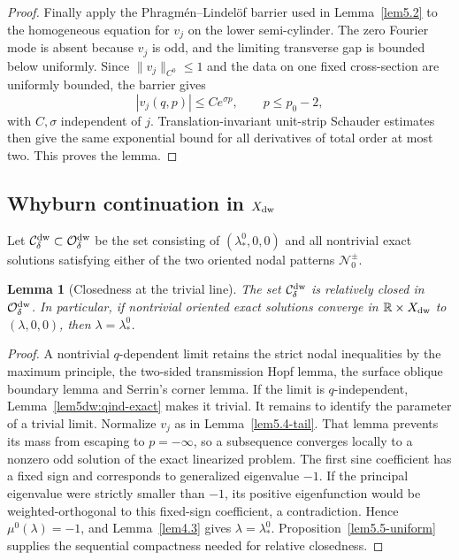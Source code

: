 \documentclass[11pt,reqno]{amsart}
\numberwithin{equation}{section}
\newtheorem{lemma}[theorem]{Lemma}
\theoremstyle{definition}
\theoremstyle{remark}
\begin{document}
\begin{proof}
Finally apply the Phragm\'en--Lindel\"of barrier used in
Lemma~\ref{lem5.2} to the homogeneous equation for $v_j$ on the lower
semi-cylinder.  The zero Fourier mode is absent because $v_j$ is odd,
and the limiting transverse gap is bounded below uniformly.  Since
$\|v_j\|_{C^0}\le1$ and the data on one fixed cross-section are
uniformly bounded, the barrier gives
\[
 |v_j(q,p)|\le Ce^{\sigma p},\qquad p\le p_0-2,
\]
with $C,\sigma$ independent of $j$.  Translation-invariant unit-strip
Schauder estimates then give the same exponential bound for all
derivatives of total order at most two.  This proves the lemma.
\end{proof}

\subsection{Whyburn continuation in $X_{\rm dw}$}

Let $\mathcal C_\delta^{\rm dw}\subset\mathcal O_\delta^{\rm dw}$ be
the set consisting of $(\lambda_*^0,0,0)$ and all nontrivial exact
solutions satisfying either of the two oriented nodal patterns
$\mathcal N_0^\pm$.

\begin{lemma}[Closedness at the trivial line]
\label{lem5.4}
The set $\mathcal C_\delta^{\rm dw}$ is relatively closed in
$\mathcal O_\delta^{\rm dw}$.  In particular, if nontrivial oriented
exact solutions converge in $\mathbb R\times X_{\rm dw}$ to
$(\lambda,0,0)$, then $\lambda=\lambda_*^0$.
\end{lemma}
\begin{proof}
A nontrivial $q$-dependent limit retains the strict nodal inequalities
by the maximum principle, the two-sided transmission Hopf lemma, the
surface oblique boundary lemma and Serrin's corner lemma.  If the limit
is $q$-independent, Lemma~\ref{lem5dw:qind-exact} makes it trivial.
It remains to identify the parameter of a trivial limit.  Normalize
$v_j$ as in Lemma~\ref{lem5.4-tail}.  That lemma prevents its mass from
escaping to $p=-\infty$, so a subsequence converges locally to a
nonzero odd solution of the exact linearized problem.  The first sine
coefficient has a fixed sign and corresponds to generalized eigenvalue
$-1$.  If the principal eigenvalue were strictly smaller than $-1$,
its positive eigenfunction would be weighted-orthogonal to this
fixed-sign coefficient, a contradiction.  Hence
$\mu^0(\lambda)=-1$, and Lemma~\ref{lem4.3} gives
$\lambda=\lambda_*^0$.  Proposition~\ref{lem5.5-uniform} supplies the
sequential compactness needed for relative closedness.
\end{proof}
\end{document}
